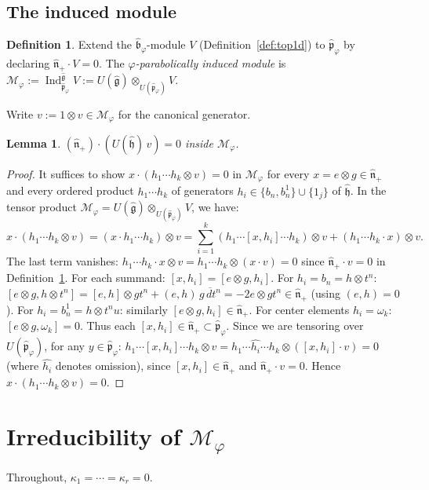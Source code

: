 \documentclass{amsart}
\DeclareMathOperator{\Ind}{Ind}
\newcommand{\g}{\mathfrak{g}}
\newcommand{\h}{\mathfrak{h}}
\newcommand{\wh}[1]{\widehat{#1}}
\newcommand{\whg}{\wh{\g}}
\newcommand{\whh}{\wh{\h}}
\newcommand{\ol}{\overline}
\newtheorem{lemma}[theorem]{Lemma}
\theoremstyle{definition}
\newtheorem{definition}[theorem]{Definition}
\theoremstyle{remark}
\numberwithin{equation}{section}
\begin{document}
\subsection{The induced module}
\begin{definition}\label{def:Mcal}
Extend the $\wh{\mathfrak b}_\varphi$-module $V$
(Definition~\ref{def:top1d}) to $\wh{\mathfrak p}_\varphi$ by declaring
$\wh{\mathfrak n}_+\cdot V=0$.  The \emph{$\varphi$-parabolically
induced module} is
$\mathcal M_\varphi:=\Ind_{\wh{\mathfrak p}_\varphi}^{\whg}V
:=U(\whg)\otimes_{U(\wh{\mathfrak p}_\varphi)}V$.
\end{definition}
Write $v:=1\otimes v\in\mathcal M_\varphi$ for the canonical generator.
\begin{lemma}\label{lem:nplus-kills-Heispart}
$(\wh{\mathfrak n}_+)\cdot(U(\whh)\,v)=0$ inside $\mathcal M_\varphi$.
\end{lemma}
\begin{proof}
It suffices to show $x\cdot(h_1\cdots h_k\otimes v)=0$ in
$\mathcal M_\varphi$ for every $x=e\otimes g\in\wh{\mathfrak n}_+$ and
every ordered product $h_1\cdots h_k$ of generators
$h_i\in\{b_n,b_n^1\}\cup\{1_j\}$ of $\whh$.
In the tensor product $\mathcal M_\varphi=U(\whg)\otimes_{U(\wh{\mathfrak p}_\varphi)}V$,
we have:
\[
x\cdot(h_1\cdots h_k\otimes v)
=(x\cdot h_1\cdots h_k)\otimes v
=\sum_{i=1}^k(h_1\cdots[x,h_i]\cdots h_k)\otimes v
+(h_1\cdots h_k\cdot x)\otimes v.
\]
The last term vanishes: $h_1\cdots h_k\cdot x\otimes v=h_1\cdots h_k\otimes(x\cdot v)=0$
since $\wh{\mathfrak n}_+\cdot v=0$ in Definition~\ref{def:Mcal}.
For each summand: $[x,h_i]=[e\otimes g,h_i]$.  For $h_i=b_n=h\otimes t^n$:
$[e\otimes g,h\otimes t^n]=[e,h]\otimes gt^n+(e,h)\,\ol{g\,dt^n}
=-2e\otimes gt^n\in\wh{\mathfrak n}_+$ (using $(e,h)=0$).
For $h_i=b_n^1=h\otimes t^nu$: similarly $[e\otimes g,h_i]\in\wh{\mathfrak n}_+$.
For center elements $h_i=\omega_k$: $[e\otimes g,\omega_k]=0$.
Thus each $[x,h_i]\in\wh{\mathfrak n}_+\subset\wh{\mathfrak p}_\varphi$.
Since we are tensoring over $U(\wh{\mathfrak p}_\varphi)$, for any
$y\in\wh{\mathfrak p}_\varphi$:
$h_1\cdots[x,h_i]\cdots h_k\otimes v
=h_1\cdots\widehat{h_i}\cdots h_k\otimes([x,h_i]\cdot v)=0$
(where $\widehat{h_i}$ denotes omission), since $[x,h_i]\in\wh{\mathfrak n}_+$
and $\wh{\mathfrak n}_+\cdot v=0$.  Hence $x\cdot(h_1\cdots h_k\otimes v)=0$.
\end{proof}
\section{Irreducibility of $\mathcal M_\varphi$}\label{sec:irreducibility}
Throughout, $\kappa_1=\cdots=\kappa_r=0$.
\end{document}
